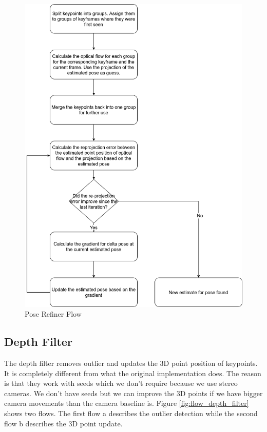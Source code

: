 \documentclass[11pt,a4paper,titlepage,oneside]{report}
\begin{document}
\begin{figure}[H]
  \centering
  \includegraphics[scale=0.3]{img/flow_pose_refiner.png}
  \caption{Pose Refiner Flow}\label{fig:flow_pose_refiner}
\end{figure}

\subsection{Depth Filter}

The depth filter removes outlier and updates the 3D point position of keypoints. It is completely different from what the original implementation does. The reason is that they work with seeds which we don't require because we use stereo cameras. We don't have seeds but we can improve the 3D points if we have bigger camera movements than the camera baseline is. Figure \ref{fig:flow_depth_filter} shows two flows. The first flow a describes the outlier detection while the second flow b describes the 3D point update.
\end{document}
